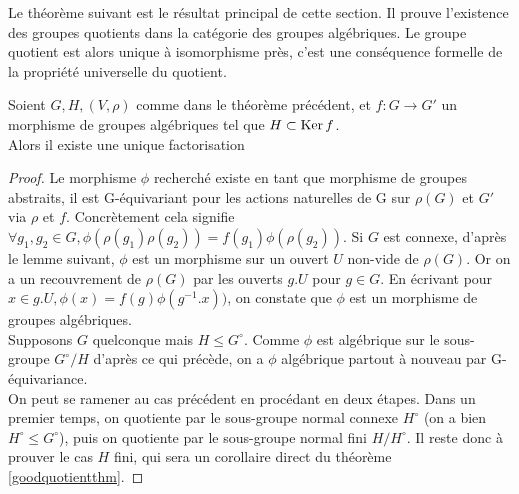 Le théorème suivant est le résultat principal de cette section. Il prouve l'existence des groupes quotients dans la catégorie des groupes algébriques. Le groupe quotient est alors unique à isomorphisme près, c'est une conséquence formelle de la propriété universelle du quotient.

\begin{thm}\label{groupequotient}
Soient $G, H, (V, \rho)$ comme dans le théorème précédent, et $f:G \rightarrow G'$ un morphisme de groupes algébriques tel que $H\subset \operatorname{Ker} f$.\\
Alors il existe une unique factorisation 	
\end{thm}
\begin{proof}
	Le morphisme $\phi$ recherché existe en tant que morphisme de groupes abstraits, il est G-équivariant pour les actions naturelles de G sur $\rho(G)$ et $G'$ via $\rho$ et $f$. Concrètement cela signifie $\forall g_1, g_2 \in G, \phi(\rho(g_1)\rho(g_2))=f(g_1)\phi(\rho(g_2))$. Si $G$ est connexe, d'après le lemme suivant, $\phi$ est un morphisme sur un ouvert $U$ non-vide de $\rho(G)$. Or on a un recouvrement de $\rho(G)$ par les ouverts $g.U$ pour $g\in G$. En écrivant pour $x\in g.U,  \phi(x)=f(g)\phi(g^{-1}.x))$, on constate que $\phi$ est un morphisme de groupes algébriques.
	\\Supposons $G$ quelconque mais $H\leq G^\circ$. Comme $\phi$ est algébrique sur le sous-groupe $G^\circ/H$ d'après ce qui précède, on a $\phi$ algébrique partout à nouveau par G-équivariance.\\
	On peut se ramener au cas précédent en procédant en deux étapes. Dans un premier temps, on quotiente par le sous-groupe normal connexe $H^\circ$ (on a bien $H^\circ\leq G^\circ$), puis on quotiente par le sous-groupe normal fini $H/H^\circ$. Il reste donc à prouver le cas $H$ fini, qui sera un corollaire direct du théorème \ref{goodquotientthm}.
\end{proof}


